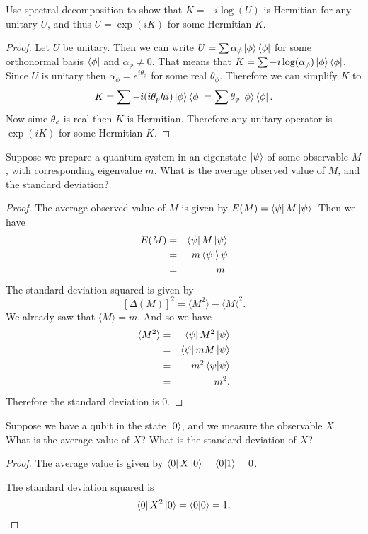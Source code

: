 \documentclass{article}
\begin{document}
\begin{exercise}
  Use spectral decomposition to show that $K=-i\log(U)$ is Hermitian for any unitary $U$, and thus $U=\exp(iK)$ for some Hermitian $K$.
  \begin{proof}
    Let $U$ be unitary. Then we can write $U=\sum\alpha_\phi\ket{\phi}\bra{\phi}$ for some orthonormal basis $\bra{\phi}$ and $\alpha_\phi\ne0$. That means that $K=\sum-i\log(\alpha_\phi)\ket{\phi}\bra{\phi}$. Since $U$ is unitary then $\alpha_\phi=e^{i\theta_\phi}$ for some real $\theta_\phi$. Therefore we can simplify $K$ to
    \[
      K=\sum -i(i\theta_phi)\ket{\phi}\bra{\phi}=\sum\theta_\phi\ket{\phi}\bra{\phi}.
    \]
    Now sime $\theta_\phi$ is real then $K$ is Hermitian. Therefore any unitary operator is $\exp(iK)$ for some Hermitian $K$.
  \end{proof}
\end{exercise}

\setcounter{exercise}{57}

\begin{exercise}
  Suppose we prepare a quantum system in an eigenstate $\ket\psi$ of some observable $M$, with corresponding eigenvalue $m$. What is the average observed value of $M$, and the standard deviation?
  \begin{proof}
    The average observed value of $M$ is given by $E(M)=\bra{\psi}M\ket\psi$. Then we have
    \begin{eqnarray*}
      E(M)&=&\bra\psi M\ket\psi \\
      &=&m\bra\psi\ket\psi \\
      &=&m.
    \end{eqnarray*}
    The standard deviation squared is given by
    \[[\Delta(M)]^2=\langle M^2\rangle-\langle M\langle^2.\]
    We already saw that $\langle M\rangle=m$. And so we have
    \begin{eqnarray*}
      \langle M^2\rangle &=& \bra{\psi}{M^2}\ket{\psi} \\
      &=& \bra\psi mM\ket\psi \\
      &=& m^2\braket\psi \\
      &=& m^2.
    \end{eqnarray*}
    Therefore the standard deviation is $0$.
  \end{proof}
\end{exercise}

\begin{exercise}
  Suppose we have a qubit in the state $\ket0$, and we measure the observable $X$. What is the average value of $X$? What is the standard deviation of $X$?
  \begin{proof}
    The average value is given by $\bra{0}X\ket{0}=\bra0\ket{1}=0$.

    The standard deviation squared is
    \[
      \bra{0}X^2\ket{0}=\bra{0}\ket{0}=1.
    \]
  \end{proof}
\end{exercise}
\end{document}

